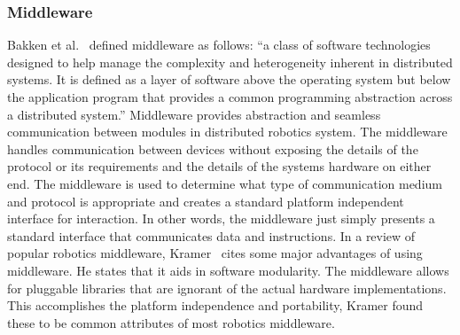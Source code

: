 \subsubsection{Middleware} %
	\label{ssub:middleware}
	Bakken et al.~\parencite{bakken2001middleware} defined middleware as follows: ``a class of software technologies designed to help manage the complexity and heterogeneity inherent in distributed systems. It is defined as a layer of software above the operating system but below the application program that provides a common programming abstraction across a distributed system.'' Middleware provides abstraction and seamless communication between modules in distributed robotics system. The middleware handles communication between devices without exposing the details of the protocol or its requirements and the details of the systems hardware on either end. The middleware is used to determine what type of communication medium and protocol is appropriate and creates a standard platform independent interface for interaction. In other words, the middleware just simply presents a standard interface that communicates data and instructions.
	In a review of popular robotics middleware, Kramer~\parencite{kramer} cites some major advantages of using middleware. He states that it aids in software modularity. The middleware allows for pluggable libraries that are ignorant of the actual hardware implementations. This accomplishes the platform independence and portability, Kramer found these to be common attributes of most robotics middleware.
	





